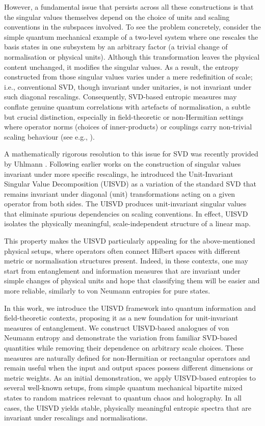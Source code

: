 \documentclass[11pt,a4paper]{article}
\begin{document}
However, a fundamental issue that persists across all these constructions is that the singular values themselves depend on the choice of units and scaling conventions in the subspaces involved. To see the problem concretely, consider the simple quantum mechanical example of a two-level system where one rescales the basis states in one subsystem by an arbitrary factor (a trivial change of normalisation or physical units). Although this transformation leaves the physical content unchanged, it modifies the singular values. As a result, the entropy constructed from those singular values varies under a mere redefinition of scale; i.e., conventional SVD, though invariant under unitaries, is not invariant under such diagonal rescalings. Consequently, SVD-based entropic measures may conflate genuine quantum correlations with artefacts of normalisation, a subtle but crucial distinction, especially in field-theoretic or non-Hermitian settings where operator norms (choices of inner-products) or couplings carry non-trivial scaling behaviour (see e.g., \cite{Edvardsson:2022day}).

A mathematically rigorous resolution to this issue for SVD was recently provided by Uhlmann \cite{uhlmann-main2}. Following earlier works on the construction of singular values invariant under more specific rescalings, he introduced the Unit-Invariant Singular Value Decomposition (UISVD) as a variation of the standard SVD that remains invariant under diagonal (unit) transformations acting on a given operator from both sides. The UISVD produces unit-invariant singular values that eliminate spurious dependencies on scaling conventions. In effect, UISVD isolates the physically meaningful, scale-independent structure of a linear map.

This property makes the UISVD particularly appealing for the above-mentioned physical setups, where operators often connect Hilbert spaces with different metric or normalisation structures present. Indeed, in these contexts, one may start from entanglement and information measures that are invariant under simple changes of physical units and hope that classifying them will be easier and more reliable, similarly to von Neumann entropies for pure states.

In this work, we introduce the UISVD framework into quantum information and field-theoretic contexts, proposing it as a new foundation for unit-invariant measures of entanglement. We construct UISVD-based analogues of von Neumann entropy and demonstrate the variation from familiar SVD-based quantities while removing their dependence on arbitrary scale choices. These measures are naturally defined for non-Hermitian or rectangular operators and remain useful when the input and output spaces possess different dimensions or metric weights. As an initial demonstration, we apply UISVD-based entropies to several well-known setups, from simple quantum mechanical bipartite mixed states to random matrices relevant to quantum chaos and holography. In all cases, the UISVD yields stable, physically meaningful entropic spectra that are invariant under rescalings and normalisations.
\end{document}
